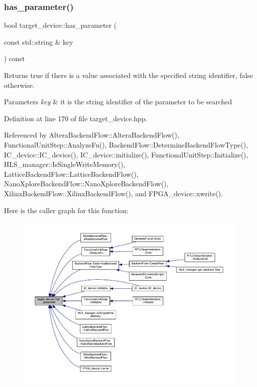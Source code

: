 \subsubsection{\texorpdfstring{has\+\_\+parameter()}{has\_parameter()}}
{\footnotesize\ttfamily bool target\+\_\+device\+::has\+\_\+parameter (\begin{DoxyParamCaption}\item[{const std\+::string \&}]{key }\end{DoxyParamCaption}) const\hspace{0.3cm}{\ttfamily [inline]}}



Returns true if there is a value associated with the specified string identifier, false otherwise. 


\begin{DoxyParams}{Parameters}
{\em key} & it is the string identifier of the parameter to be searched \\
\hline
\end{DoxyParams}


Definition at line 170 of file target\+\_\+device.\+hpp.



Referenced by Altera\+Backend\+Flow\+::\+Altera\+Backend\+Flow(), Functional\+Unit\+Step\+::\+Analyze\+Fu(), Backend\+Flow\+::\+Determine\+Backend\+Flow\+Type(), I\+C\+\_\+device\+::\+I\+C\+\_\+device(), I\+C\+\_\+device\+::initialize(), Functional\+Unit\+Step\+::\+Initialize(), H\+L\+S\+\_\+manager\+::\+Is\+Single\+Write\+Memory(), Lattice\+Backend\+Flow\+::\+Lattice\+Backend\+Flow(), Nano\+Xplore\+Backend\+Flow\+::\+Nano\+Xplore\+Backend\+Flow(), Xilinx\+Backend\+Flow\+::\+Xilinx\+Backend\+Flow(), and F\+P\+G\+A\+\_\+device\+::xwrite().

Here is the caller graph for this function\+:
\nopagebreak
\begin{figure}[H]
\begin{center}
\leavevmode
\includegraphics[width=350pt]{d9/dd8/classtarget__device_a1ecf11f7b98c92c243f93a10d919f375_icgraph}
\end{center}
\end{figure}
\mbox{\label{classtarget__device_a8036fcb32879f6d3acd5b3f71a457a3e}} 
